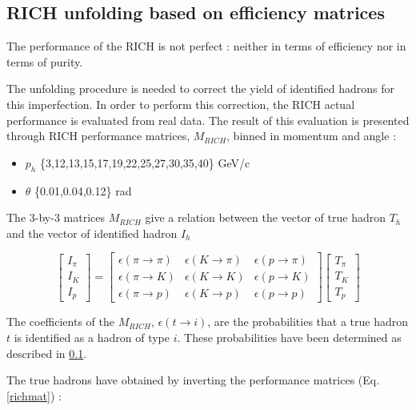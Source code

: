 \documentclass[letterpaper,12pt]{article}
\begin{document}
\subsection{RICH unfolding based on efficiency matrices}

The performance of the RICH is not perfect : neither in terms of efficiency nor in terms
of purity.

The unfolding procedure is needed to correct the yield of identified hadrons for this imperfection.
In order to perform this correction, the RICH actual performance is evaluated from real data. The result of
this evaluation is presented through RICH performance matrices, $M_{RICH}$, binned in momentum
and angle :

\begin{itemize}
  \item $p_h$ \{3,12,13,15,17,19,22,25,27,30,35,40\} GeV/c
  \item $\theta$ \{0.01,0.04,0.12\} rad
\end{itemize}

The 3-by-3 matrices $M_{RICH}$ give a relation between the vector of true hadron $T_h$ and the vector of
identified hadron $I_h$

\begin{equation}
\begin{bmatrix}
I_{\pi} \\
I_K \\
I_p
\end{bmatrix}
=
\begin{bmatrix}
\epsilon(\pi \rightarrow \pi) & \epsilon(K \rightarrow \pi) & \epsilon(p \rightarrow \pi)\\
\epsilon(\pi \rightarrow K) & \epsilon(K \rightarrow K) & \epsilon(p \rightarrow K) \\
\epsilon(\pi \rightarrow p) & \epsilon(K \rightarrow p) & \epsilon(p \rightarrow p)
\end{bmatrix}
\begin{bmatrix}
T_{\pi} \\
T_K \\
T_p
\end{bmatrix}
\end{equation}

The coefficients of the $M_{RICH}$, $\epsilon(t \rightarrow i)$, are the probabilities that a true hadron
$t$ is identified as a hadron of type $i$. These probabilities have been determined as described in \ref{}.

The true hadrons have obtained by inverting the performance matrices (Eq.\ref{richmat}) :
\end{document}
